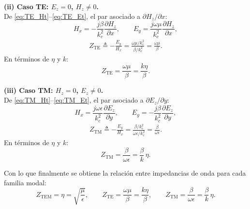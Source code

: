 \documentclass[
  11pt,
  letterpaper,
   addpoints,
   answers
  ]{exam}
\begin{document}
\begin{questions}
\begin{parts}
\begin{subparts}
\begin{solution}
\vspace{8pt}
\noindent
\begin{minipage}[t]{0.485\linewidth}
\textbf{(ii) Caso TE: $E_z=0$, $H_z\neq 0$.}\\[4pt]
De \eqref{eq:TE_Ht}--\eqref{eq:TE_Et}, el par asociado a $\partial H_z/\partial x$:
\[
H_x=-\frac{j\beta}{k_c^2}\frac{\partial H_z}{\partial x},
\qquad
E_y=\frac{j\omega\mu}{k_c^2}\frac{\partial H_z}{\partial x},
\]
\begin{align*}
Z_{\mathrm{TE}}
\triangleq
-\frac{E_y}{H_x}
= \frac{\omega\mu/k_c^2}{\beta/k_c^2}
= \frac{\omega\mu}{\beta}.
\end{align*}
En términos de $\eta$ y $k$:
\[
Z_{\mathrm{TE}}=\frac{\omega\mu}{\beta}=\frac{k\eta}{\beta}.
\]
\end{minipage}%
\hfill
\begin{minipage}[t]{0.485\linewidth}
\textbf{(iii) Caso TM: $H_z=0$, $E_z\neq 0$.}\\[4pt]
De \eqref{eq:TM_Ht}--\eqref{eq:TM_Et}, el par asociado a $\partial E_z/\partial y$:
\[
H_x=\frac{j\omega\epsilon}{k_c^2}\frac{\partial E_z}{\partial y},
\qquad
E_y=-\frac{j\beta}{k_c^2}\frac{\partial E_z}{\partial y},
\]
\begin{align*}
Z_{\mathrm{TM}}
\triangleq
-\frac{E_y}{H_x}
= \frac{\beta/k_c^2}{\omega\epsilon/k_c^2}
= \frac{\beta}{\omega\epsilon}.
\end{align*}
En términos de $\eta$ y $k$:
\[
Z_{\mathrm{TM}}=\frac{\beta}{\omega\epsilon}=\frac{\beta}{k}\,\eta.
\]
\end{minipage}

\vspace{10pt}
\noindent
Con lo que finalmente se obtiene la relación entre impedancias de onda para cada familia modal:
\begin{equation}
\boxed{
Z_{\mathrm{TEM}}=\eta=\sqrt{\frac{\mu}{\epsilon}},
\qquad
Z_{\mathrm{TE}}=\frac{\omega\mu}{\beta}=\frac{k\eta}{\beta},
\qquad
Z_{\mathrm{TM}}=\frac{\beta}{\omega\epsilon}=\frac{\beta}{k}\,\eta.
}
\end{equation}


\end{solution}
\end{subparts}
\end{parts}
\end{questions}
\end{document}
